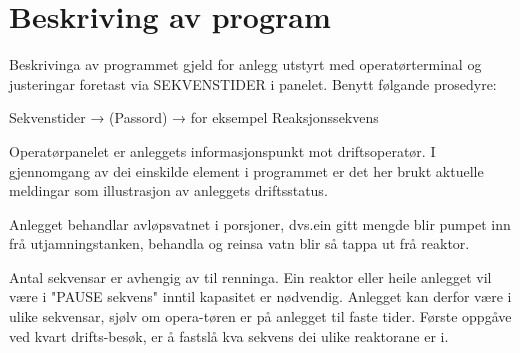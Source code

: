 \newpage
\section{Beskriving av program}
Beskrivinga av programmet gjeld for anlegg utstyrt med operatørterminal og justeringar foretast via SEKVENSTIDER i panelet. Benytt følgande prosedyre:

Sekvenstider → (Passord) → for eksempel Reaksjonssekvens 

Operatørpanelet er anleggets informasjonspunkt mot driftsoperatør. I gjennomgang av dei einskilde element i programmet er det her brukt aktuelle meldingar som illustrasjon av anleggets driftsstatus.

Anlegget behandlar avløpsvatnet i porsjoner, dvs.ein gitt mengde blir pumpet inn frå utjamningstanken, behandla og reinsa vatn blir så tappa ut frå reaktor.

Antal sekvensar er avhengig av til renninga. Ein reaktor eller heile anlegget vil være i "PAUSE sekvens" inntil kapasitet er nødvendig. 
Anlegget kan derfor være i ulike sekvensar, sjølv om opera-tøren er på anlegget til faste tider. Første oppgåve ved kvart drifts-besøk, er å fastslå kva sekvens dei ulike reaktorane er i.

